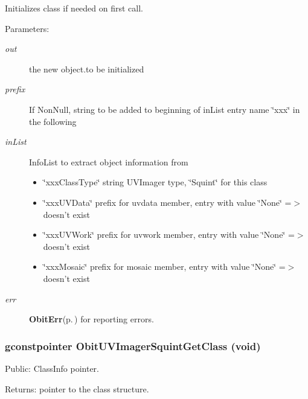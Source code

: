 Initializes class if needed on first call. \begin{Desc}
\item[Parameters:]
\begin{description}
\item[{\em out}]the new object.to be initialized \item[{\em prefix}]If Non\-Null, string to be added to beginning of in\-List entry name \char`\"{}xxx\char`\"{} in the following \item[{\em in\-List}]Info\-List to extract object information from \begin{itemize}
\item \char`\"{}xxx\-Class\-Type\char`\"{} string UVImager type, \char`\"{}Squint\char`\"{} for this class \item \char`\"{}xxx\-UVData\char`\"{} prefix for uvdata member, entry with value \char`\"{}None\char`\"{} =$>$ doesn't exist \item \char`\"{}xxx\-UVWork\char`\"{} prefix for uvwork member, entry with value \char`\"{}None\char`\"{} =$>$ doesn't exist \item \char`\"{}xxx\-Mosaic\char`\"{} prefix for mosaic member, entry with value \char`\"{}None\char`\"{} =$>$ doesn't exist \end{itemize}
\item[{\em err}]{\bf Obit\-Err}{\rm (p.\,\pageref{structObitErr})} for reporting errors. \end{description}
\end{Desc}
\subsubsection{\setlength{\rightskip}{0pt plus 5cm}gconstpointer Obit\-UVImager\-Squint\-Get\-Class (void)}\label{ObitUVImagerSquint_8h_a6}


Public: Class\-Info pointer. 

\begin{Desc}
\item[Returns:]pointer to the class structure. \end{Desc}
